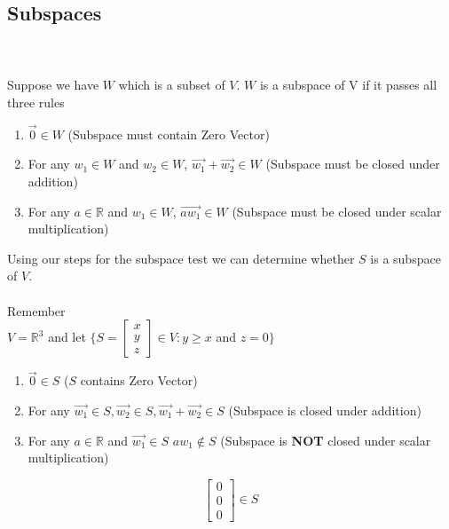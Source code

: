 \documentclass[12pt]{article}
\begin{document}
    \subsection{Subspaces}
 \\\\
Suppose we have $W$ which is a subset of $V$. $W$ is a subspace of V if it passes all three rules
\\ \begin{enumerate}
  \item $\vec{0} \in	 W$ (Subspace must contain Zero Vector)
  \item For any $w_1 \in W$ and $w_2 \in W$, $\vec{w_1}+ \vec{w_2} \in W$ (Subspace must be closed under addition)
  \item For any $a\in \mathbb{R}$ and $w_1 \in W$, $\vec{aw_1}\in W$ (Subspace must be closed under scalar multiplication)
\end{enumerate}
Using our steps for the subspace test we can determine whether $S$ is a subspace of $V$.\\\\
Remember \\
$V =  \mathbb{R}^3$ and let $ \{S = \begin{bmatrix}x \\ y \\ z \end{bmatrix} \in V : y\geq x$ and $ z = 0\}$
\\ \begin{enumerate}
  \item $\vec{0} \in S$ ($S$ contains Zero Vector) \checkmark
  \item For any $\vec{w_1} \in S, \vec{w_2} \in S, \vec{w_1}+ \vec{w_2} \in S$ (Subspace is closed under addition) \checkmark
  \item For any $a\in \mathbb{R}$ and $\vec{w_1}\in S$ $aw_1 \notin S$ (Subspace is \textbf{NOT} closed under scalar multiplication)
\end{enumerate}
\begin{equation*}
\begin{bmatrix}
0 \\ 0 \\ 0
\end{bmatrix} \in S 
\end{equation*}
\end{document}
